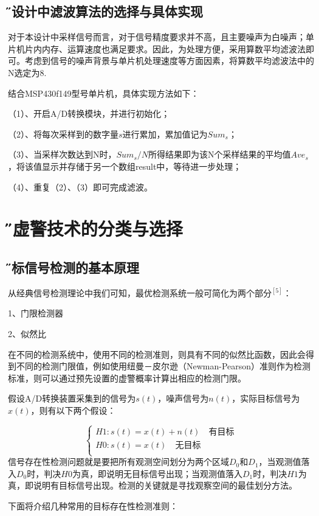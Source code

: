 \documentclass[12pt,a4paper]{article} %
\newcommand{\xiaosanhao}{\fontsize{15pt}{\baselineskip}\selectfont}    %
\begin{document}
 	\subsection{\H 本设计中滤波算法的选择与具体实现}
对于本设计中采样信号而言，对于信号精度要求并不高，且主要噪声为白噪声；单片机片内内存、运算速度也满足要求。因此，为处理方便，采用算数平均滤波法即可。考虑到信号的噪声背景与单片机处理速度等方面因素，将算数平均滤波法中的N选定为8.
 	\par 结合MSP430f149型号单片机，具体实现方法如下：
 	\par （1）、开启A/D转换模块，并进行初始化；
 	\par （2）、将每次采样到的数字量$s$进行累加，累加值记为$Sum_s$；
 	\par （3）、当采样次数达到N时，$Sum_s/N$所得结果即为该N个采样结果的平均值$Ave_s$，将该值显示并存储于另一个数组result中，等待进一步处理；
 	\par （4）、重复（2）、（3）即可完成滤波。
 
 
 
 
 
 \newpage
 \section{\xiaosanhao \H  恒虚警技术的分类与选择}
 	\subsection{\H 目标信号检测的基本原理}
从经典信号检测理论中我们可知，最优检测系统一般可简化为两个部分$^{[5]}$：
 	\par 1、门限检测器
 	\par 2、似然比
 	\par 在不同的检测系统中，使用不同的检测准则，则具有不同的似然比函数，因此会得到不同的检测门限值，例如使用纽曼－皮尔逊（Newman-Pearson）准则作为检测标准，则可以通过预先设置的虚警概率计算出相应的检测门限。
 	\par 假设A/D转换装置采集到的信号为$s(t)$，噪声信号为$n(t)$，实际目标信号为$x(t)$，则有以下两个假设：
 	
 	
 	\begin{equation}
	\left\{
\begin{array}{rcl}

H1:s(t)=x(t)+n(t)\quad 有目标\\
H0:s(t)=x(t) \quad 无目标\\

\end{array} \right. 
	\end{equation}
	信号存在性检测问题就是要把所有观测空间划分为两个区域$D_0$和$D_1$，当观测值落入$D_0$时，判决$H0$为真，即说明无目标信号出现；当观测值落入$D_1$时，判决$H1$为真，即说明有目标信号出现。检测的关键就是寻找观察空间的最佳划分方法。
	\par 下面将介绍几种常用的目标存在性检测准则：
	
\end{document}

